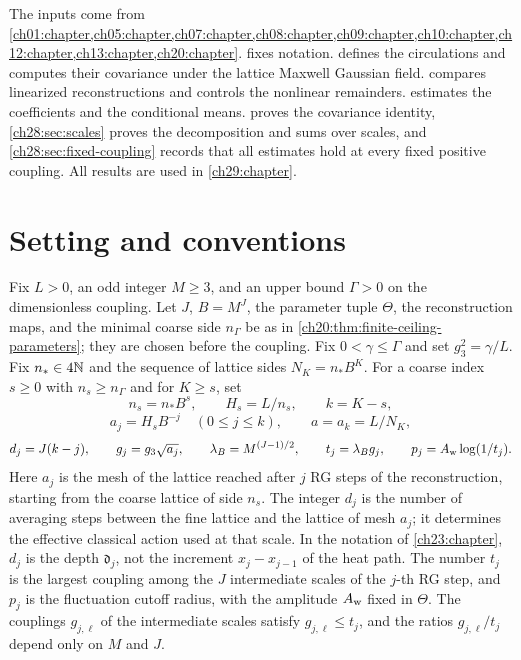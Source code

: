 The inputs come from \cref{ch01:chapter,ch05:chapter,ch07:chapter,ch08:chapter,ch09:chapter,ch10:chapter,ch12:chapter,ch13:chapter,ch20:chapter}.  fixes notation.  defines the circulations and computes their covariance under the lattice Maxwell Gaussian field.  compares linearized reconstructions and controls the nonlinear remainders.  estimates the coefficients and the conditional means.  proves the covariance identity, \cref{ch28:sec:scales} proves the decomposition and sums over scales, and \cref{ch28:sec:fixed-coupling} records that all estimates hold at every fixed positive coupling. All results are used in \cref{ch29:chapter}.

\section{Setting and conventions}\label{ch28:sec:setting}

Fix $L>0$, an odd integer $M\ge3$, and an upper bound $\Gamma>0$ on the dimensionless coupling. Let $J$, $B=M^J$, the parameter tuple $\Theta$, the reconstruction maps, and the minimal coarse side $n_\Gamma$ be as in \cref{ch20:thm:finite-ceiling-parameters}; they are chosen before the coupling. Fix $0<\gamma\le\Gamma$ and set $g_3^2=\gamma/L$. Fix $n_*\in4\mathbb N$ and the sequence of lattice sides $N_K=n_*B^K$. For a coarse index $s\ge0$ with $n_s\ge n_\Gamma$ and for $K\ge s$, set
\[
 n_s=n_*B^s,\qquad H_s=L/n_s,\qquad k=K-s,
\]
\[
 a_j=H_sB^{-j}\quad(0\le j\le k),\qquad a=a_k=L/N_K,
\]
\[
 d_j=J(k-j),\qquad g_j=g_3\sqrt{a_j},\qquad \lambda_B=M^{(J-1)/2},\qquad t_j=\lambda_Bg_j,\qquad p_j=A_{\rm w}\log(1/t_j).
\]
Here $a_j$ is the mesh of the lattice reached after $j$ RG steps of the reconstruction, starting from the coarse lattice of side $n_s$. The integer $d_j$ is the number of averaging steps between the fine lattice and the lattice of mesh $a_j$; it determines the effective classical action used at that scale. In the notation of \cref{ch23:chapter}, $d_j$ is the depth $\mathfrak d_j$, not the increment $x_j-x_{j-1}$ of the heat path. The number $t_j$ is the largest coupling among the $J$ intermediate scales of the $j$-th RG step, and $p_j$ is the fluctuation cutoff radius, with the amplitude $A_{\rm w}$ fixed in $\Theta$. The couplings $g_{j,\ell}$ of the intermediate scales satisfy $g_{j,\ell}\le t_j$, and the ratios $g_{j,\ell}/t_j$ depend only on $M$ and $J$.

